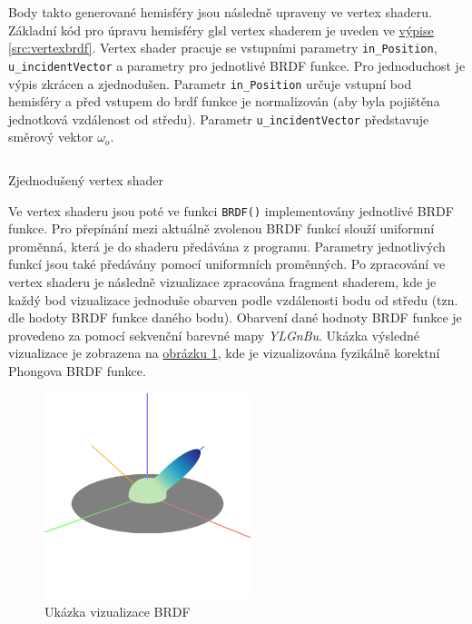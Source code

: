 \documentclass[czech,master]{diploma}
\newcommand{\outVec}{\omega_{o}}
\begin{document}
Body takto generované hemisféry jsou následně upraveny ve vertex shaderu. Základní kód pro úpravu hemisféry glsl vertex shaderem je uveden ve \hyperref[src:vertexbrdf]{výpise \ref{src:vertexbrdf}}. Vertex shader pracuje se vstupními parametry \texttt{in\_Position}, \texttt{u\_incidentVector} a parametry pro jednotlivé BRDF funkce. Pro jednoduchost je výpis zkrácen a zjednodušen. Parametr \texttt{in\_Position} určuje vstupní bod hemisféry a před vstupem do brdf funkce je normalizován (aby byla pojištěna jednotková vzdálenost od středu). Parametr \texttt{u\_incidentVector} představuje směrový vektor $\outVec$. \par

\begin{listing}[ht]
  \inputminted{c++}{sampleshader.glsl}
  \caption{Zjednodušený vertex shader}
  \label{src:vertexbrdf}
\end{listing}

Ve vertex shaderu jsou poté ve funkci \texttt{BRDF()} implementovány jednotlivé BRDF funkce. Pro přepínání mezi aktuálně zvolenou BRDF funkcí slouží uniformní proměnná, která je do shaderu předávána z programu. Parametry jednotlivých funkcí jsou také předávány pomocí uniformních proměnných. Po zpracování ve vertex shaderu je následně vizualizace zpracována fragment shaderem, kde je každý bod vizualizace jednoduše obarven podle vzdálenosti bodu od středu (tzn. dle hodoty BRDF funkce daného bodu). Obarvení dané hodnoty BRDF funkce je provedeno za pomocí sekvenční barevné mapy \textit{YLGnBu}. Ukázka výsledné vizualizace je zobrazena na \hyperref[fig:brdfExample]{obrázku \ref{fig:brdfExample}}, kde je vizualizována fyzikálně korektní Phongova BRDF funkce.

\begin{figure}
  \centering
  \includegraphics[width=6cm]{Figures/brdfVizExample.png}
  \caption{Ukázka vizualizace BRDF}%
  \label{fig:brdfExample}%
\end{figure}
\end{document}
